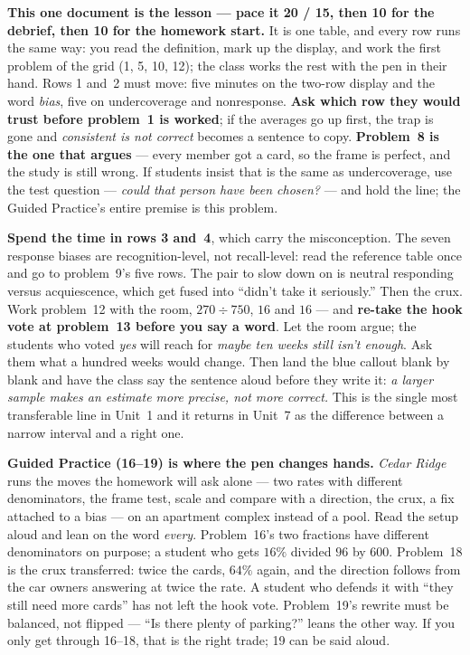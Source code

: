\documentclass[10pt]{article}
\begin{document}
\begin{teachernote}
\textbf{This one document is the lesson --- pace it 20 / 15, then 10 for the debrief, then 10
for the homework start.} It is one table, and every row runs the same way: you read the
definition, mark up the display, and work the first problem of the grid (1, 5, 10, 12); the
class works the rest with the pen in their hand. Rows 1 and~2 must move: five minutes on the
two-row display and the word \emph{bias}, five on undercoverage and nonresponse. \textbf{Ask
which row they would trust before problem~1 is worked}; if the averages go up first, the trap
is gone and \emph{consistent is not correct} becomes a sentence to copy. \textbf{Problem~8 is
the one that argues} --- every member got a card, so the frame is perfect, and the study is
still wrong. If students insist that is the same as undercoverage, use the test question ---
\emph{could that person have been chosen?} --- and hold the line; the Guided Practice's entire
premise is this problem.

\textbf{Spend the time in rows 3 and~4}, which carry the misconception. The seven response
biases are recognition-level, not recall-level: read the reference table once and go to
problem~9's five rows. The pair to slow down on is neutral responding versus acquiescence,
which get fused into ``didn't take it seriously.'' Then the crux. Work problem~12 with the
room, $270 \div 750$, $16$ and $16$ --- and \textbf{re-take the hook vote at problem~13 before
you say a word}. Let the room argue; the students who voted \emph{yes} will reach for
\emph{maybe ten weeks still isn't enough}. Ask them what a hundred weeks would change. Then
land the blue callout blank by blank and have the class say the sentence aloud before they
write it: \emph{a larger sample makes an estimate more precise, not more correct.} This is the
single most transferable line in Unit~1 and it returns in Unit~7 as the difference between a
narrow interval and a right one.

\textbf{Guided Practice (16--19) is where the pen changes hands.} \emph{Cedar Ridge} runs the
moves the homework will ask alone --- two rates with different denominators, the frame test,
scale and compare with a direction, the crux, a fix attached to a bias --- on an apartment
complex instead of a pool. Read the setup aloud and lean on the word \emph{every}.
Problem~16's two fractions have different denominators on purpose; a student who gets $16\%$
divided $96$ by $600$. Problem~18 is the crux transferred: twice the cards, $64\%$ again, and
the direction follows from the car owners answering at twice the rate. A student who defends it
with ``they still need more cards'' has not left the hook vote. Problem~19's rewrite must be
balanced, not flipped --- ``Is there plenty of parking?'' leans the other way. If you only get
through 16--18, that is the right trade; 19 can be said aloud.


\end{teachernote}
\end{document}

